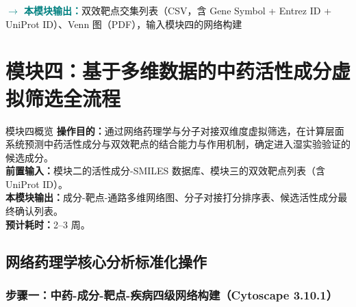 \documentclass[12pt,a4paper,twoside]{article}
\newcommand{\moduleoutput}[1]{\par\vspace{6pt}\noindent\textcolor{teal}{\textbf{$\rightarrow$ 本模块输出：}}#1\vspace{6pt}}
\begin{document}
\moduleoutput{双效靶点交集列表（CSV，含 Gene Symbol + Entrez ID + UniProt ID）、Venn 图（PDF），输入模块四的网络构建}

\section{模块四：基于多维数据的中药活性成分虚拟筛选全流程}
\label{sec:module4}

\begin{infobox}{模块四概览}
\textbf{操作目的：}通过网络药理学与分子对接双维度虚拟筛选，在计算层面系统预测中药活性成分与双效靶点的结合能力与作用机制，确定进入湿实验验证的候选成分。\\
\textbf{前置输入：}模块二的活性成分-SMILES 数据库、模块三的双效靶点列表（含 UniProt ID）。\\
\textbf{本模块输出：}成分-靶点-通路多维网络图、分子对接打分排序表、候选活性成分最终确认列表。\\
\textbf{预计耗时：}2--3 周。
\end{infobox}

\subsection{网络药理学核心分析标准化操作}
\label{sec:module4_network}

\subsubsection{步骤一：中药-成分-靶点-疾病四级网络构建（Cytoscape 3.10.1）}
\end{document}
